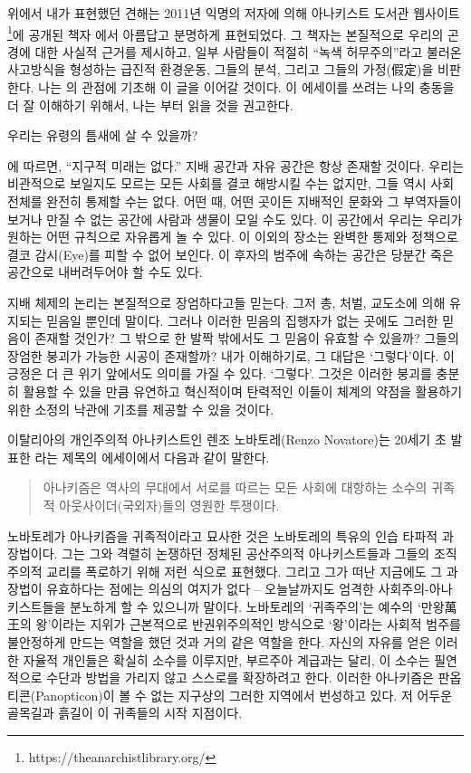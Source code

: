 \documentclass[10pt, b6paper, openany]{memoir}
\begin{document}
\begin{article}
위에서 내가 표현했던 견해는 2011년 익명의 저자에 의해 아나키스트 도서관 웹사이트\footnote{https://theanarchistlibrary.org/}에 공개된 책자 \cite{bk:desert2011}에서 아름답고 분명하게 표현되었다. 그 책자는 본질적으로 우리의 곤경에 대한 사실적 근거를 제시하고, 일부 사람들이 적절히 ``녹색 허무주의''라고 불러온 사고방식을 형성하는 급진적 환경운동, 그들의 분석, 그리고 그들의 가정(假定)을 비판한다. 나는 의 관점에 기초해 이 글을 이어갈 것이다. 이 에세이를 쓰려는 나의 충동을 더 잘 이해하기 위해서, 나는 부터 읽을 것을 권고한다.

우리는 유령의 틈새에 살 수 있을까? 

에 따르면, ``지구적 미래는 없다.'' 지배 공간과 자유 공간은 항상 존재할 것이다. 우리는 비관적으로 보일지도 모르는 모든 사회를 결코 해방시킬 수는 없지만, 그들 역시 사회 전체를 완전히 통제할 수는 없다. 어떤 때, 어떤 곳이든 지배적인 문화와 그 부역자들이 보거나 만질 수 없는 공간에 사람과 생물이 모일 수도 있다. 이 공간에서 우리는 우리가 원하는 어떤 규칙으로 자유롭게 놀 수 있다. 이 이외의 장소는 완벽한 통제와 정책으로 결코 감시(Eye)를 피할 수 없어 보인다. 이 후자의 범주에 속하는 공간은 당분간 죽은 공간으로 내버려두어야 할 수도 있다. 

지배 체제의 논리는 본질적으로 장엄하다고들 믿는다. 그저 총, 처벌, 교도소에 의해 유지되는 믿음일 뿐인데 말이다. 그러나 이러한 믿음의 집행자가 없는 곳에도 그러한 믿음이 존재할 것인가? 그 밖으로 한 발짝 밖에서도 그 믿음이 유효할 수 있을까? 그들의 장엄한 붕괴가 가능한 시공이 존재할까? 내가 이해하기로, 그 대답은 `그렇다'이다. 이 긍정은 더 큰 위기 앞에서도 의미를 가질 수 있다. `그렇다'. 그것은 이러한 붕괴를 충분히 활용할 수 있을 만큼 유연하고 혁신적이며 탄력적인 이들이 체계의 약점을 활용하기 위한 소정의 낙관에 기초를 제공할 수 있을 것이다. 

이탈리아의 개인주의적 아나키스트인 렌조 노바토레(Renzo Novatore)는 20세기 초 발표한 \cite{ibk:renzo2012}라는 제목의 에세이에서 다음과 같이 말한다.

\begin{quote}
아나키즘은 역사의 무대에서 서로를 따르는 모든 사회에 대항하는 소수의 귀족적 아웃사이더(국외자)들의 영원한 투쟁이다.
\end{quote}

노바토레가 아나키즘을 귀족적이라고 묘사한 것은 노바토레의 특유의 인습 타파적 과장법이다. 그는 그와 격렬히 논쟁하던 정체된 공산주의적 아나키스트들과 그들의 조직주의적 교리를 폭로하기 위해 저런 식으로 표현했다. 그리고 그가 떠난 지금에도 그 과장법이 유효하다는 점에는 의심의 여지가 없다 – 오늘날까지도 엄격한 사회주의-아나키스트들을 분노하게 할 수 있으니까 말이다. 노바토레의 `귀족주의'는 예수의 `만왕萬王의 왕'이라는 지위가 근본적으로 반권위주의적인 방식으로 `왕'이라는 사회적 범주를 불안정하게 만드는 역할을 했던 것과 거의 같은 역할을 한다. 자신의 자유를 얻은 이러한 자율적 개인들은 확실히 소수를 이루지만, 부르주아 계급과는 달리, 이 소수는 필연적으로 수단과 방법을 가리지 않고 스스로를 확장하려고 한다. 이러한 아나키즘은 판옵티콘(Panopticon)이 볼 수 없는 지구상의 그러한 지역에서 번성하고 있다. 저 어두운 골목길과 흙길이 이 귀족들의 시작 지점이다.


\end{article}
\end{document}
